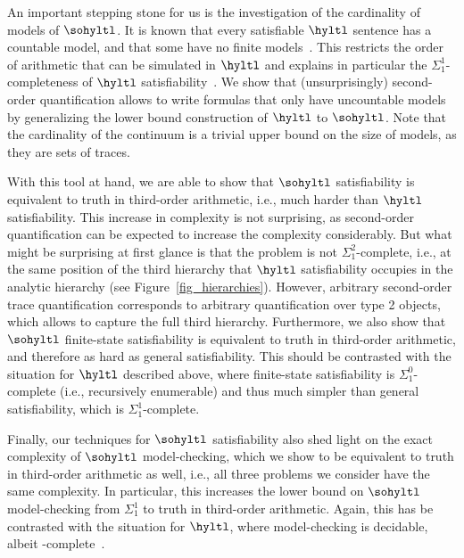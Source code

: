 An important stepping stone for us is the investigation of the cardinality of models of $\sohyltl$. 
It is known that every satisfiable $\hyltl$ sentence has a countable model, and that some have no finite models~\cite{FZ17}.
This restricts the order of arithmetic that can be simulated in $\hyltl$ and explains in particular the $\Sigma_1^1$-completeness of $\hyltl$ satisfiability~\cite{hyperltlsatconf}.
We show that (unsurprisingly) second-order quantification allows to write formulas that only have uncountable models by generalizing the lower bound construction of $\hyltl$ to $\sohyltl$. 
Note that the cardinality of the continuum is a trivial upper bound on the size of models, as they are sets of traces. 

With this tool at hand, we are able to show that $\sohyltl$ satisfiability is equivalent to truth in third-order arithmetic, i.e., much harder than $\hyltl$ satisfiability.
This increase in complexity is not surprising, as second-order quantification can be expected to increase the complexity considerably.
But what might be surprising at first glance is that the problem is not $\Sigma_1^2$-complete, i.e., at the same position of the third hierarchy that $\hyltl$ satisfiability occupies in the analytic hierarchy (see Figure~\ref{fig_hierarchies}). However, arbitrary second-order trace quantification corresponds to arbitrary quantification over type 2 objects, which allows to capture the full third hierarchy.
Furthermore, we also show that $\sohyltl$ finite-state satisfiability is equivalent to truth in third-order arithmetic, and therefore as hard as general satisfiability.
This should be contrasted with the situation for $\hyltl$ described above, where finite-state satisfiability is $\Sigma_1^0$-complete (i.e., recursively enumerable) and thus much simpler than general satisfiability, which is $\Sigma_1^1$-complete.


Finally, our techniques for $\sohyltl$ satisfiability also shed light on the exact complexity of $\sohyltl$ model-checking, which we show to be equivalent to  truth in third-order arithmetic as well, i.e., all three problems we consider have the same complexity. In particular, this increases the lower bound on $\sohyltl$ model-checking from $\Sigma_1^1$ to truth in third-order arithmetic.
Again, this has be contrasted with the situation for $\hyltl$, where model-checking is decidable, albeit \tower-complete~\cite{Rabe16diss,MZ20}.

